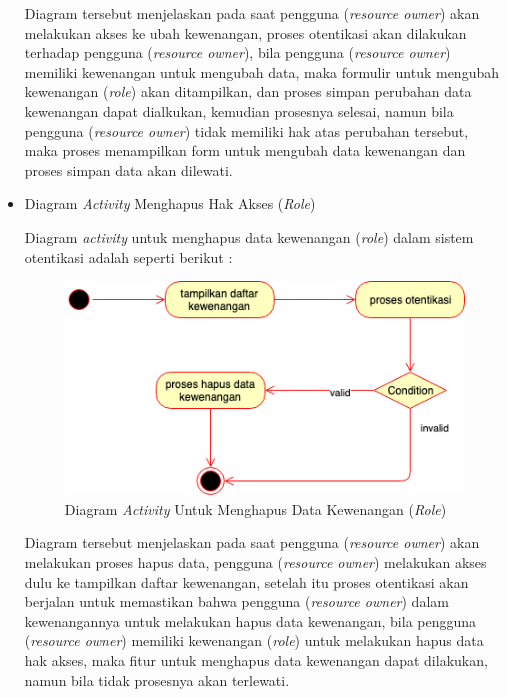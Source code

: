 \documentclass[pdftex,12pt, oneside]{article}
\begin{document}
\begin{itemize}
	Diagram tersebut menjelaskan pada saat pengguna (\textit{resource owner}) akan melakukan akses ke ubah kewenangan, proses otentikasi akan dilakukan terhadap pengguna (\textit{resource owner}), bila pengguna (\textit{resource owner}) memiliki kewenangan untuk mengubah data, maka formulir untuk mengubah kewenangan (\textit{role}) akan ditampilkan, dan proses simpan perubahan data kewenangan dapat dialkukan, kemudian prosesnya selesai, namun bila pengguna (\textit{resource owner}) tidak memiliki hak atas perubahan tersebut, maka proses menampilkan form untuk mengubah data kewenangan dan proses simpan data akan dilewati.
	
	\item Diagram \textit{Activity} Menghapus Hak Akses (\textit{Role})
	
	Diagram \textit{activity} untuk menghapus data kewenangan (\textit{role}) dalam sistem otentikasi adalah seperti berikut :
	
	\begin{figure}[H]
		\centering
		\includegraphics[width=1\textwidth]{./resources/act-dia-remove-role}
		\caption{Diagram \textit{Activity} Untuk Menghapus Data Kewenangan (\textit{Role})}
		\label{fig:act-dia-remove-role}
	\end{figure}
	
	Diagram tersebut menjelaskan pada saat pengguna (\textit{resource owner}) akan melakukan proses hapus data, pengguna (\textit{resource owner}) melakukan akses dulu ke tampilkan daftar kewenangan, setelah itu proses otentikasi akan berjalan untuk memastikan bahwa pengguna (\textit{resource owner}) dalam kewenangannya untuk melakukan hapus data kewenangan, bila pengguna (\textit{resource owner}) memiliki kewenangan (\textit{role}) untuk melakukan hapus data hak akses, maka fitur untuk menghapus data kewenangan dapat dilakukan, namun bila tidak prosesnya akan terlewati.
	

\end{itemize}
\end{document}
